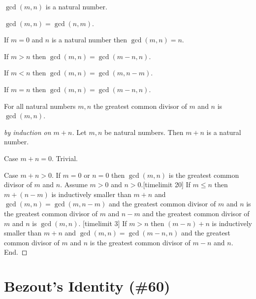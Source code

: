 \documentclass{article}
\begin{document}
\begin{forthel}
\begin{signature}
$\gcd(m,n)$ is a natural number.
\end{signature}

\begin{axiom}
$\gcd(m,n) = \gcd(n,m)$.
\end{axiom}

\begin{axiom}
If $m=0$ and $n$ is a natural number then $\gcd(m,n)=n$.
\end{axiom}
\begin{axiom}
If $m > n$ then $\gcd(m,n) = \gcd(m-n,n)$.
\end{axiom}
\begin{axiom}
If $m < n$ then $\gcd(m,n) = \gcd(m,n-m)$.
\end{axiom}
\begin{axiom}
If $m = n$ then $\gcd(m,n) = \gcd(m-n,n)$.
\end{axiom}


\begin{proposition}
For all natural numbers $m,n$ the greatest common divisor of $m$ and $n$ is $\gcd(m,n)$.
\end{proposition}
\begin{proof}[by induction on $m+n$]
Let $m,n$ be natural numbers.
Then $m+n$ is a natural number.

Case $m + n =0$. Trivial.

Case $m + n > 0$.
If $m=0$ or $n=0$ then $\gcd(m,n)$ is 
the greatest common divisor of $m$ and $n$.
Assume $m>0$ and $n>0$.[timelimit 20]
If $m \leq n$ then $m + (n-m)$ is inductively smaller than $m + n$ and
$\gcd(m,n) = \gcd(m,n-m)$ and
the greatest common divisor of $m$ and $n$ is 
the greatest common divisor of $m$ and $n-m$
and the greatest common divisor of $m$ and $n$ is $\gcd(m,n)$. [timelimit 3]
If $m > n$ then $(m-n) + n$ is inductively smaller than $m + n$ and
$\gcd(m,n) = \gcd(m-n,n)$ and 
the greatest common divisor of $m$ and $n$ is 
the greatest common divisor of $m-n$ and $n$. End.
\end{proof}
\end{forthel}


\section{Bezout's Identity (\#60)}
\end{document}
